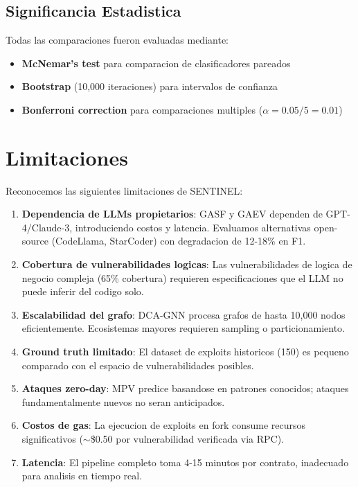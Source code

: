 \documentclass[11pt]{article}
\theoremstyle{definition}
\theoremstyle{plain}
\theoremstyle{remark}
\begin{document}
\subsection{Significancia Estadistica}

Todas las comparaciones fueron evaluadas mediante:
\begin{itemize}
    \item \textbf{McNemar's test} para comparacion de clasificadores pareados
    \item \textbf{Bootstrap} (10,000 iteraciones) para intervalos de confianza
    \item \textbf{Bonferroni correction} para comparaciones multiples ($\alpha = 0.05/5 = 0.01$)
\end{itemize}

\section{Limitaciones}
\label{sec:limitaciones}

Reconocemos las siguientes limitaciones de SENTINEL:

\begin{enumerate}
    \item \textbf{Dependencia de LLMs propietarios}: GASF y GAEV dependen de GPT-4/Claude-3, introduciendo costos y latencia. Evaluamos alternativas open-source (CodeLlama, StarCoder) con degradacion de 12-18\% en F1.
    
    \item \textbf{Cobertura de vulnerabilidades logicas}: Las vulnerabilidades de logica de negocio compleja (65\% cobertura) requieren especificaciones que el LLM no puede inferir del codigo solo.
    
    \item \textbf{Escalabilidad del grafo}: DCA-GNN procesa grafos de hasta 10,000 nodos eficientemente. Ecosistemas mayores requieren sampling o particionamiento.
    
    \item \textbf{Ground truth limitado}: El dataset de exploits historicos (150) es pequeno comparado con el espacio de vulnerabilidades posibles.
    
    \item \textbf{Ataques zero-day}: MPV predice basandose en patrones conocidos; ataques fundamentalmente nuevos no seran anticipados.
    
    \item \textbf{Costos de gas}: La ejecucion de exploits en fork consume recursos significativos ($\sim$\$0.50 por vulnerabilidad verificada via RPC).
    
    \item \textbf{Latencia}: El pipeline completo toma 4-15 minutos por contrato, inadecuado para analisis en tiempo real.
\end{enumerate}
\end{document}
